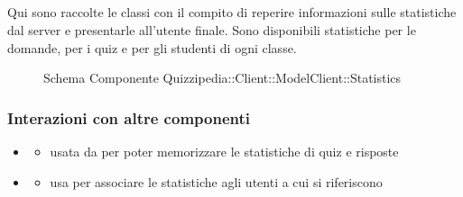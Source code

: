 \subsection{}
Qui sono raccolte le classi con il compito di reperire informazioni sulle statistiche dal server e presentarle all'utente finale. Sono disponibili statistiche per le domande, per i quiz e per gli studenti di ogni classe.
\begin{figure}[H]
\centering
\noindent{}
\caption[Schema Componente Quizzipedia::Client::ModelClient::Statistics]{Schema Componente Quizzipedia::Client::ModelClient::Statistics}
\end{figure}
\subsubsection{Interazioni con altre componenti}
\begin{itemize}
\item {}
\begin{itemize}
\item usata da  per poter memorizzare le statistiche di quiz e risposte
\end{itemize}
\item {}
\begin{itemize}
\item usa  per associare le statistiche agli utenti a cui si riferiscono
\end{itemize}
\end{itemize}
